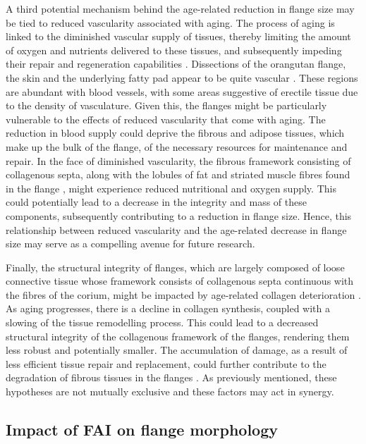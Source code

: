 A third potential mechanism behind the age-related reduction in flange size may be tied to reduced vascularity associated with aging. The process of aging is linked to the diminished vascular supply of tissues, thereby limiting the amount of oxygen and nutrients delivered to these tissues, and subsequently impeding their repair and regeneration capabilities \citep{Prisby.2007}. Dissections of the orangutan flange, the skin and the underlying fatty pad appear to be quite vascular \citep{Straus.1942}. These regions are abundant with blood vessels, with some areas suggestive of erectile tissue due to the density of vasculature. Given this, the flanges might be particularly vulnerable to the effects of reduced vascularity that come with aging. The reduction in blood supply could deprive the fibrous and adipose tissues, which make up the bulk of the flange, of the necessary resources for maintenance and repair.
In the face of diminished vascularity, the fibrous framework consisting of collagenous septa, along with the lobules of fat and striated muscle fibres found in the flange \citep{Straus.1942, Winkler.1989}, might experience reduced nutritional and oxygen supply. This could potentially lead to a decrease in the integrity and mass of these components, subsequently contributing to a reduction in flange size. Hence, this relationship between reduced vascularity and the age-related decrease in flange size may serve as a compelling avenue for future research.

Finally, the structural integrity of flanges, which are largely composed of loose connective tissue whose framework consists of collagenous septa continuous with the fibres of the corium, might be impacted by age-related collagen deterioration \citep{Straus.1942}. As aging progresses, there is a decline in collagen synthesis, coupled with a slowing of the tissue remodelling process. This could lead to a decreased structural integrity of the collagenous framework of the flanges, rendering them less robust and potentially smaller. The accumulation of damage, as a result of less efficient tissue repair and replacement, could further contribute to the degradation of fibrous tissues in the flanges \citep{Cox.2011, Haus.2007}. As previously mentioned, these hypotheses are not mutually exclusive and these factors may act in synergy.

\subsection{Impact of FAI on flange morphology}

